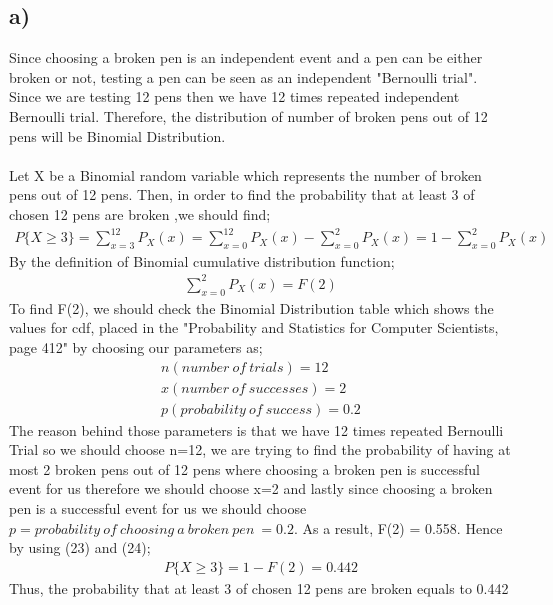 \documentclass[12pt]{article}
\begin{document}
\subsection*{a)} Since choosing a broken pen is an independent event and a pen can be either broken or not, testing a pen can be seen as an independent "Bernoulli trial". Since we are testing 12 pens then we have 12 times repeated independent Bernoulli trial. Therefore, the distribution of number of broken pens out of 12 pens will be Binomial Distribution. \\ \\
Let X be a Binomial random variable which represents the number of broken pens out of 12 pens. Then, in order to find the probability that at least 3 of chosen 12 pens are broken ,we should find; 
\begin{equation} 
\begin{split}
P\{X\geq 3\} = \sum_{x=3}^{12} P_{X}(x) = \sum_{x=0}^{12} P_{X}(x) - \sum_{x=0}^{2} P_{X}(x) = 1 - \sum_{x=0}^{2} P_{X}(x)
\end{split}
\end{equation}
By the definition of Binomial cumulative distribution function;
\begin{equation} 
\begin{split}
 \sum_{x=0}^{2} P_{X}(x) = F(2)
\end{split}
\end{equation}
To find F(2), we should check the Binomial Distribution table which shows the values for cdf, placed in the "Probability and Statistics for Computer Scientists, page 412" by choosing our parameters as; 
\begin{equation*} 
\begin{split}
n (number \ of \ trials) = 12 \\
x (number \ of \ successes) = 2 \\
p (probability\ of\ success) = 0.2
\end{split}
\end{equation*}
The reason behind those parameters is that we have 12 times repeated Bernoulli Trial so we should choose n=12, we are trying to find the probability of having at most 2 broken pens out of 12 pens where choosing a broken pen is  successful event for us therefore we should choose x=2 and lastly since choosing a broken pen is a successful event for us we should choose $p = probability\ of\ choosing\ a\ broken\ pen\ = 0.2$.
As a result, F(2) = 0.558. Hence by using (23) and (24);
\begin{equation*} 
\begin{split}
P\{X\geq 3\} = 1 - F(2) = 0.442
\end{split}
\end{equation*}
Thus, the probability that at least 3 of chosen 12 pens are broken equals to 0.442
\end{document}
